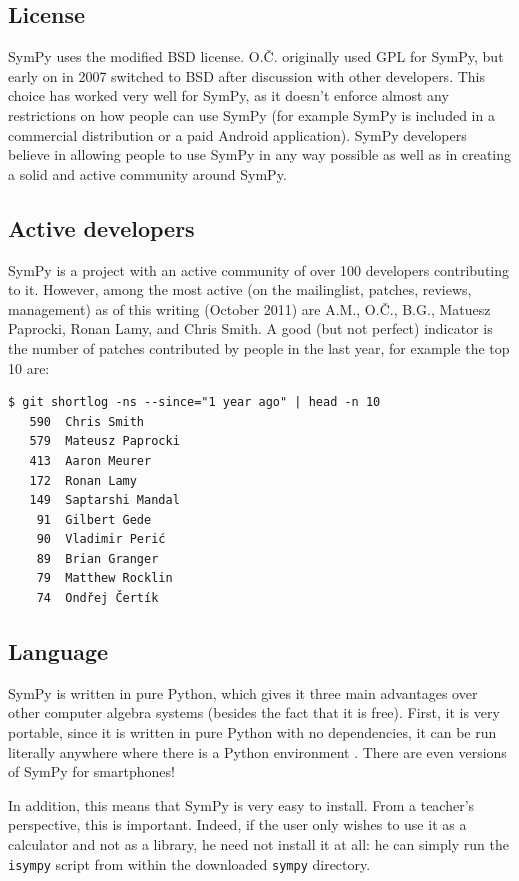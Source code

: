 \documentclass[12pt]{article}
\def\OC{O.Č.}
\def\AM{A.M.}
\def\BG{B.G.}
\begin{document}
\subsection{License}

SymPy uses the modified BSD license. \OC{} originally used GPL for SymPy, but
early on in 2007 switched to BSD after discussion with other developers. This
choice has worked very well for SymPy, as it doesn't enforce almost any
restrictions on how people can use SymPy (for example SymPy is included in
a commercial distribution or a paid Android application). SymPy developers
believe in allowing people to use SymPy in any way possible as well as in
creating a solid and active community around SymPy.

\subsection{Active developers}

SymPy is a project with an active community of
over 100 developers contributing to it. However, among the most active (on the
mailinglist, patches, reviews, management) as of this writing (October 2011)
are \AM, \OC, \BG, Matuesz Paprocki, Ronan Lamy, and Chris
Smith. A good (but not perfect) indicator is the number of patches contributed by
people in the last year, for example the top 10 are:

\begin{Verbatim}[fontsize=\scriptsize,fontfamily=courier,fontshape=tt,frame=single,label=git-log]
$ git shortlog -ns --since="1 year ago" | head -n 10
   590  Chris Smith
   579  Mateusz Paprocki
   413  Aaron Meurer
   172  Ronan Lamy
   149  Saptarshi Mandal
    91  Gilbert Gede
    90  Vladimir Perić
    89  Brian Granger
    79  Matthew Rocklin
    74  Ondřej Čertík
\end{Verbatim}


\subsection{Language}

SymPy is written in pure Python, which gives it three main advantages
over other computer algebra systems (besides the fact that it is free).
First, it is very portable, since it is written in pure Python with no
dependencies, it can be run literally anywhere where there is a Python
environment . There are even versions of SymPy for smartphones!

In addition, this means that SymPy is very easy to install.  From a
teacher's perspective, this is important. Indeed, if the user only
wishes to use it as a calculator and not as a library, he need not
install it at all:  he can simply run the {\tt isympy} script from
within the downloaded {\tt sympy} directory.
\end{document}
